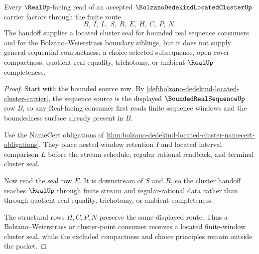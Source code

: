 \begin{theorem}
\label{thm:bolzano-dedekind-located-cluster-real-handoff}
Every $\RealUp$-facing read of an accepted $\BolzanoDedekindLocatedClusterUp$ carrier factors through the finite route
$$
B,\ I,\ L,\ S,\ R,\ E,\ H,\ C,\ P,\ N .
$$
The handoff supplies a located cluster seal for bounded real sequence consumers and for the Bolzano--Weierstrass boundary siblings, but it does not supply general sequential compactness, a choice-selected subsequence, open-cover compactness, quotient real equality, trichotomy, or ambient $\RealUp$ completeness.
\end{theorem}
\begin{proof}
Start with the bounded source row. By \autoref{def:bolzano-dedekind-located-cluster-carrier}, the sequence source is the displayed $\BoundedRealSequenceUp$ row $B$, so any Real-facing consumer first reads finite sequence windows and the boundedness surface already present in $B$.

Use the NameCert obligations of \autoref{thm:bolzano-dedekind-located-cluster-namecert-obligations}. They place nested-window retention $I$ and located interval comparison $L$ before the stream schedule, regular rational readback, and terminal cluster seal.

Now read the seal row $E$. It is downstream of $S$ and $R$, so the cluster handoff reaches $\RealUp$ through finite stream and regular-rational data rather than through quotient real equality, trichotomy, or ambient completeness.

The structural rows $H,C,P,N$ preserve the same displayed route. Thus a Bolzano--Weierstrass or cluster-point consumer receives a located finite-window cluster seal, while the excluded compactness and choice principles remain outside the packet.
\end{proof}



